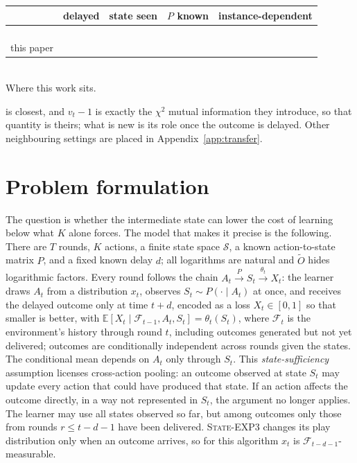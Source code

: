 \documentclass{article}
\theoremstyle{remark}
\newcommand{\Ex}{\mathbb{E}}
\newcommand{\Ot}{\widetilde{O}}
\newcommand{\Sset}{\mathcal{S}}
\newcommand{\cm}{\ding{51}}
\newcommand{\xm}{\ding{55}}
\begin{document}
\begin{center}\small
\begin{tabular}{@{}lcccc@{}}
\toprule
 & delayed & state seen & $P$ known & instance-dependent \\
\midrule
\citet{zimmert2020}   & \cm & \xm & \xm & \xm \\
\citet{esposito2023}  & \cm & \cm & \xm & \xm \\
\citet{eldowa2024}    & \xm & \cm & \cm & \cm \\
\citet{baron2025}     & \cm & \xm & \xm & \cm \\
this paper            & \cm & \cm & \cm & \cm \\
\bottomrule
\end{tabular}\\[2pt]
Where this work sits.
\end{center}

\citet{eldowa2024} is closest, and $v_t-1$ is exactly the $\chi^2$ mutual information they
introduce, so that quantity is theirs; what is new is its role once the outcome is delayed. Other
neighbouring settings are placed in Appendix~\ref{app:transfer}.

\section{Problem formulation}\label{sec:setting}

The question is whether the intermediate state can lower the cost of learning below what $K$ alone
forces. The model that makes it precise is the following.
There are $T$ rounds, $K$ actions, a finite state space $\Sset$, a known action-to-state matrix
$P$, and a fixed known delay $d$; all
logarithms are natural and $\Ot$ hides logarithmic factors. Every round follows the chain
$A_t\xrightarrow{\;P\;}S_t\xrightarrow{\;\theta_t\;}X_t$: the learner draws $A_t$ from a distribution $x_t$,
observes $S_t\sim P(\cdot\mid A_t)$ at once, and receives the delayed outcome only at time $t+d$, encoded as a loss
$X_t\in[0,1]$ so that smaller is better, with
$\Ex[X_t\mid\mathcal F_{t-1},A_t,S_t]=\theta_t(S_t)$, where $\mathcal F_t$ is the environment's history
through round $t$, including outcomes generated but not yet delivered; outcomes are conditionally
independent across rounds given the states. The conditional mean depends on $A_t$ only through $S_t$. This
\emph{state-sufficiency} assumption licenses cross-action pooling: an outcome observed at state
$S_t$ may update every action that could have produced that state. If an action affects the outcome
directly, in a way not represented in $S_t$, the argument no longer applies. The learner may use all states observed so far, but
among outcomes only those from rounds $r\le t-d-1$ have been delivered. \textsc{State-EXP3} changes
its play distribution only when an outcome arrives, so for this algorithm $x_t$ is
$\mathcal F_{t-d-1}$-measurable.
\end{document}

